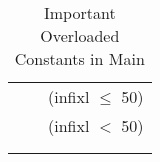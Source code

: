 \begin{isabellebody}
\begin{isamarkuptext}
\begin{table}[htbp]
\begin{center}
\begin{tabular}{lll}
\isa{less{\isacharunderscore}eq} & \isa{{\isacharprime}a{\isasymColon}ord\ {\isasymRightarrow}\ {\isacharprime}a{\isasymColon}ord\ {\isasymRightarrow}\ bool} & (infixl $\le$ 50) \\
\isa{less} & \isa{{\isacharprime}a{\isasymColon}ord\ {\isasymRightarrow}\ {\isacharprime}a{\isasymColon}ord\ {\isasymRightarrow}\ bool} & (infixl $<$ 50) \\
\isa{top} & \isa{{\isacharprime}a{\isasymColon}top} \\
\isa{bot} & \isa{{\isacharprime}a{\isasymColon}bot}
\end{tabular}
\caption{Important Overloaded Constants in Main}
\label{tab:overloading}
\end{center}
\end{table}%
\end{isamarkuptext}%
\isamarkuptrue%
%
\isadelimtheory
%
\endisadelimtheory
%
\isatagtheory
%
\endisatagtheory
{\isafoldtheory}%
%
\isadelimtheory
%
\endisadelimtheory
\end{isabellebody}%
